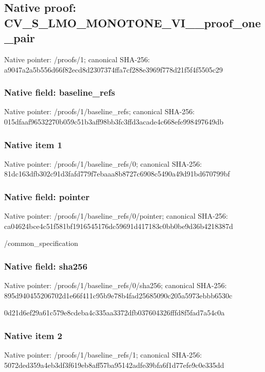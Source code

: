 \documentclass[10pt,a4paper]{article}
\begin{document}
\subsection{Native proof: CV\_\allowbreak{}S\_\allowbreak{}LMO\_\allowbreak{}MONOTONE\_\allowbreak{}VI\_\allowbreak{}\_\allowbreak{}proof\_\allowbreak{}one\_\allowbreak{}pair}
Native pointer: /proofs/1; canonical SHA-256: a9047a2a5b556d66f82ecd8d2307374ffa7cf288e3969f778d21f5f4f5505c29

\subsubsection{Native field: baseline\_\allowbreak{}refs}
Native pointer: /proofs/1/baseline\_\allowbreak{}refs; canonical SHA-256: 015dfaaf96532270b059c51b3aff98bb3fc3ffd3acade4c668efe998497649db

\subsubsection{Native item 1}
Native pointer: /proofs/1/baseline\_\allowbreak{}refs/0; canonical SHA-256: 81dc163dfb302c91d3fafd779f7ebaaa8b8727c6908c5490a49d91bd670799bf

\subsubsection{Native field: pointer}
Native pointer: /proofs/1/baseline\_\allowbreak{}refs/0/pointer; canonical SHA-256: ca04624bce4c51f581bf1916545176dc59691d417183c0bb0be9d36b4218387d

\begingroup\raggedright\sloppy /\allowbreak{}common\_\allowbreak{}specification\par\endgroup

\subsubsection{Native field: sha256}
Native pointer: /proofs/1/baseline\_\allowbreak{}refs/0/sha256; canonical SHA-256: 895d940455206702d1e66f411c95b9e78b4fad25685090c205a5973ebbb6530c

\begingroup\raggedright\sloppy 0d21d6ef29a61c579e8cdeba4c335aa3372dfb037604326fffd8f5fad7a54c0a\par\endgroup

\subsubsection{Native item 2}
Native pointer: /proofs/1/baseline\_\allowbreak{}refs/1; canonical SHA-256: 5072ded359a4eb3df3f619eb8aff57ba95142adfe39bfa6f1d77efe9c0e335dd
\end{document}
